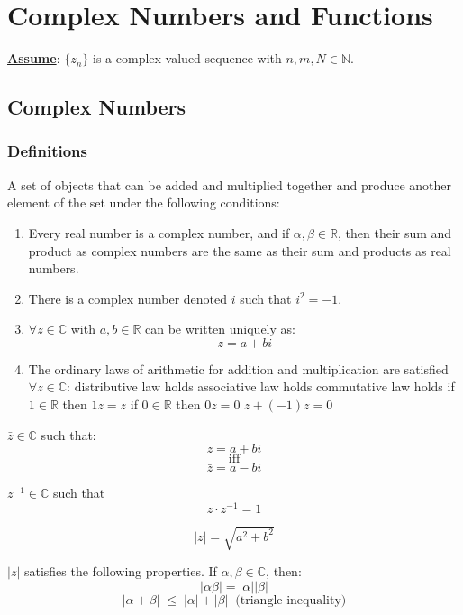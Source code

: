 \chapter{Complex Numbers and Functions}

\underline{\textbf{Assume}}: $\{ {z}_{n} \}$ is a complex valued sequence with $n,m, N \in \mathbb{N}$.
\section{Complex Numbers}
\subsection{Definitions}
\begin{defn}
	A set of objects that can be added and multiplied together and produce another element of the set under the following conditions:
	\begin{enumerate}
		\item Every real number is a complex number, and if $\alpha, \beta \in \mathbb{R}$, then their sum and product as complex numbers are the same as their sum and products as real numbers.
		\item There is a complex number denoted $i$ such that $i^2 = -1$.
		\item $\forall z \in \mathbb{C}$ with $a, b \in \mathbb{R}$ can be written uniquely as: \[z = a + bi\]
		\item The ordinary laws of arithmetic for addition and multiplication are satisfied $\forall z \in \mathbb{C}$:
		\subitem distributive law holds
		\subitem associative law holds
		\subitem commutative law holds
		\subitem if $1 \in \mathbb{R}$ then $1z = z$
		\subitem if $0 \in \mathbb{R}$ then $0z = 0$
		\subitem $z + (-1)z = 0$
	\end{enumerate}
\end{defn}
\begin{defn}
	$\bar{z} \in \mathbb{C}$ such that: 
	\[ z = a + bi\] \[\text{iff}\] \[\bar{z} = a - bi \]
\end{defn}
\begin{defn}
	$z^{-1} \in \mathbb{C}$ such that \[z\cdot z^{-1} = 1\]
\end{defn}
\begin{defn}
	\[|z| = \sqrt{a^2 + b^2}\]
\end{defn}
\begin{thm}
	$|z|$ satisfies the following properties. If $\alpha, \beta \in \mathbb{C}$, then:
	\[|\alpha\beta| = |\alpha||\beta|\]
	\[|\alpha + \beta| \;\leq\; |\alpha| + |\beta| \;\;\text{(triangle inequality)}\]
\end{thm}
